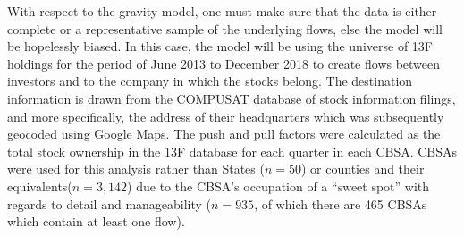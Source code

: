 With respect to the gravity model, one must make sure that the data is either complete or a representative sample of the underlying flows, else the model will be hopelessly biased.  In this case, the model will be using the universe of 13F holdings for the period of June 2013 to December 2018 to create flows between investors and to the company in which the stocks belong.  The destination information is drawn from the COMPUSAT database \citep{Compustat} of stock information filings, and more specifically, the address of their headquarters which was subsequently geocoded using Google Maps.  The push and pull factors were calculated as the total stock ownership in the 13F database for each quarter in each CBSA.  CBSAs were used for this analysis rather than States ($n=50$) or counties and their equivalents($n=3,142$) due to the CBSA's occupation of a ``sweet spot'' with regards to detail and manageability  ($n= 935$, of which there are 465 CBSAs which contain at least one flow).  

